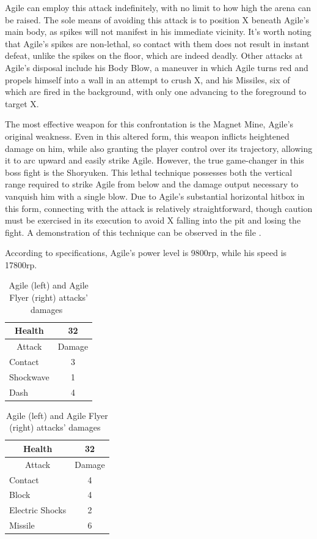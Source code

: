  Agile can employ this attack indefinitely, with no limit to how high the arena can be raised. The sole means of avoiding this attack is to position X beneath Agile's main body, as spikes will not manifest in his immediate vicinity. It's worth noting that Agile's spikes are non-lethal, so contact with them does not result in instant defeat, unlike the spikes on the floor, which are indeed deadly. Other attacks at Agile's disposal include his Body Blow, a maneuver in which Agile turns red and propels himself into a wall in an attempt to crush X, and his Missiles, six of which are fired in the background, with only one advancing to the foreground to target X.

The most effective weapon for this confrontation is the Magnet Mine, Agile's original weakness. Even in this altered form, this weapon inflicts heightened damage on him, while also granting the player control over its trajectory, allowing it to arc upward and easily strike Agile. However, the true game-changer in this boss fight is the Shoryuken. This lethal technique possesses both the vertical range required to strike Agile from below and the damage output necessary to vanquish him with a single blow. Due to Agile's substantial horizontal hitbox in this form, connecting with the attack is relatively straightforward, though caution must be exercised in its execution to avoid X falling into the pit and losing the fight. A demonstration of this technique can be observed in the file .

According to specifications, Agile's power level is 9800rp, while his speed is 17800rp.

\begin{table}[htp]
	\begin{minipage}{.45\linewidth}
		\centering
		\begin{tabular}[h]{l c }
			\toprule
			\multicolumn{1}{c}{Health}  & 32 \\
			\midrule
			\multicolumn{1}{c}{Attack} & \multicolumn{1}{c}{Damage}\\
			Contact & 3\\
			Shockwave& 1\\
			Dash& 4\\
			\bottomrule
		\end{tabular}
	\end{minipage}
	\begin{minipage}{.45\linewidth}
		\centering
		\begin{tabular}[h]{l c }
			\toprule
			\multicolumn{1}{c}{Health}  & 32 \\
			\midrule
			\multicolumn{1}{c}{Attack} & \multicolumn{1}{c}{Damage}\\
			Contact & 4 \\
			Block & 4\\
			Electric Shocks & 2\\
			Missile& 6\\
			\bottomrule
		\end{tabular}
	\end{minipage}
	\caption{Agile (left) and Agile Flyer (right) attacks' damages~\cite{wiki:Agile}}
\end{table}


